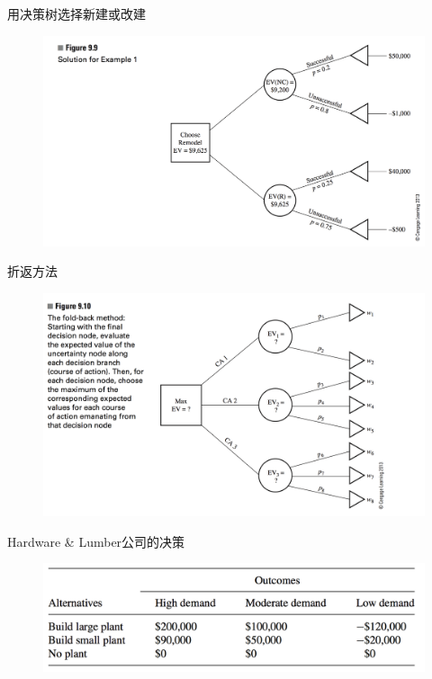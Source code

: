 \documentclass[mathserif, table]{beamer}
\begin{document}
\begin{frame}{用决策树选择新建或改建}
  
  \begin{figure}
    \centering
    \includegraphics[width=\textwidth{}]{9_9.png}
  \end{figure}

\end{frame}

\begin{frame}{折返方法}
  
  \begin{figure}
    \centering
    \includegraphics[width=\textwidth{}]{9_10.png}
  \end{figure}

\end{frame}

\begin{frame}{Hardware \& Lumber公司的决策}
  
  \begin{figure}
    \centering
    \includegraphics[width=\textwidth{}]{factories.png}
  \end{figure}

\end{frame}
\end{document}
